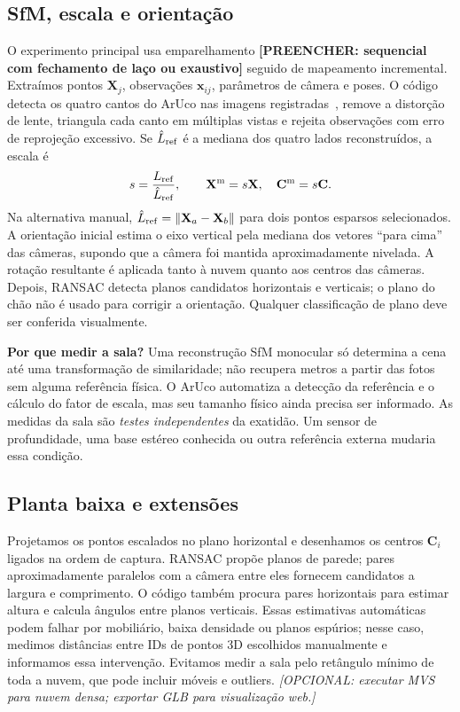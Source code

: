 \documentclass[10pt,a4paper]{article}
\newcommand{\Resultado}[1]{\textcolor{red!65!black}{\textbf{[PREENCHER: #1]}}}
\newcommand{\Opcional}[1]{\textcolor{blue!50!black}{\textit{[OPCIONAL: #1]}}}
\begin{document}
\subsection{SfM, escala e orientação}
O experimento principal usa emparelhamento \Resultado{sequencial com fechamento de laço ou exaustivo} seguido de mapeamento incremental. Extraímos pontos $\mathbf{X}_j$, observações $\mathbf{x}_{ij}$, parâmetros de câmera e poses. O código detecta os quatro cantos do ArUco nas imagens registradas~\cite{aruco}, remove a distorção de lente, triangula cada canto em múltiplas vistas e rejeita observações com erro de reprojeção excessivo. Se $\hat L_{\rm ref}$ é a mediana dos quatro lados reconstruídos, a escala é
\begin{equation}
 s=\frac{L_{\rm ref}}{\hat L_{\rm ref}},\qquad
 \mathbf{X}^{\rm m}=s\mathbf{X},\quad \mathbf{C}^{\rm m}=s\mathbf{C}.
\end{equation}
Na alternativa manual, $\hat L_{\rm ref}=\lVert\mathbf{X}_a-\mathbf{X}_b\rVert$ para dois pontos esparsos selecionados. A orientação inicial estima o eixo vertical pela mediana dos vetores ``para cima'' das câmeras, supondo que a câmera foi mantida aproximadamente nivelada. A rotação resultante é aplicada tanto à nuvem quanto aos centros das câmeras. Depois, RANSAC detecta planos candidatos horizontais e verticais; o plano do chão não é usado para corrigir a orientação. Qualquer classificação de plano deve ser conferida visualmente.

\textbf{Por que medir a sala?} Uma reconstrução SfM monocular só determina a cena até uma transformação de similaridade; não recupera metros a partir das fotos sem alguma referência física. O ArUco automatiza a detecção da referência e o cálculo do fator de escala, mas seu tamanho físico ainda precisa ser informado. As medidas da sala são \emph{testes independentes} da exatidão. Um sensor de profundidade, uma base estéreo conhecida ou outra referência externa mudaria essa condição.

\subsection{Planta baixa e extensões}
Projetamos os pontos escalados no plano horizontal e desenhamos os centros $\mathbf{C}_i$ ligados na ordem de captura. RANSAC propõe planos de parede; pares aproximadamente paralelos com a câmera entre eles fornecem candidatos a largura e comprimento. O código também procura pares horizontais para estimar altura e calcula ângulos entre planos verticais. Essas estimativas automáticas podem falhar por mobiliário, baixa densidade ou planos espúrios; nesse caso, medimos distâncias entre IDs de pontos 3D escolhidos manualmente e informamos essa intervenção. Evitamos medir a sala pelo retângulo mínimo de toda a nuvem, que pode incluir móveis e outliers. \Opcional{executar MVS para nuvem densa; exportar GLB para visualização web.}
\end{document}

